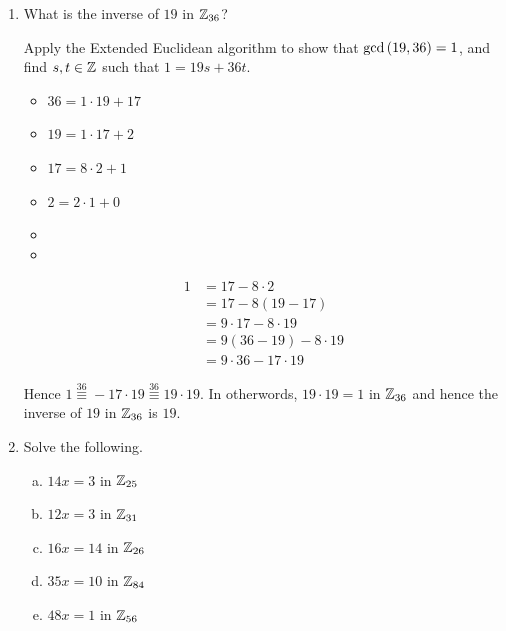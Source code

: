 \documentclass[11pt,fleqn,dvipsnames,usenames]{article}
\begin{document}
\begin{enumerate}
\item What is the inverse of $19$ in $\mathbb{Z}_{36}$?
\vsmsp

\solution Apply the Extended Euclidean algorithm to show that $\text{gcd}\left(19,36\right) = 1$, and find $s,t\in\mathbb{Z}$ such that $1 = 19s + 36t$.
\begin{multicols}{2}
\begin{itemize}[\ ]
\item $36 = 1\cdot 19 + 17$
\item $19 = 1\cdot 17 + 2$
\item $17 = 8\cdot 2 + 1$
\item $2 = 2\cdot 1 + 0$
\item
\item
\end{itemize}
\columnbreak
\begin{align*}
1 &= 17 - 8\cdot 2\\
&= 17 - 8(19 - 17)\\
&= 9\cdot 17 - 8\cdot 19\\
&= 9(36 - 19) - 8\cdot 19\\
&= 9\cdot 36 - 17\cdot 19
\end{align*}
\end{multicols}
\vspace{-0.5cm}

Hence $1\overset{36}{\equiv} -17\cdot 19\overset{36}{\equiv} 19\cdot 19$.  In otherwords, $19\cdot 19 = 1$ in $\mathbb{Z}_{36}$ and hence the inverse of $19$ in $\mathbb{Z}_{36}$ is $19$.

\item Solve the following.
\begin{enumerate}[(a)]
\item $14x = 3$ in $\mathbb{Z}_{25}$
\item $12x = 3$ in $\mathbb{Z}_{31}$
\item $16x = 14$ in $\mathbb{Z}_{26}$
\item $35x = 10$ in $\mathbb{Z}_{84}$
\item $48x = 1$ in $\mathbb{Z}_{56}$
\end{enumerate}
\vsmsp


\end{enumerate}
\end{document}

